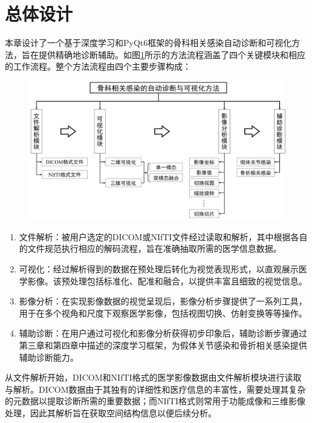 \section{总体设计}

本章设计了一个基于深度学习和PyQt6框架的骨科相关感染自动诊断和可视化方法，旨在提供精确地诊断辅助。如图\ref{fig:chap05_overall}所示的方法流程涵盖了四个关键模块和相应的工作流程。整个方法流程由四个主要步骤构成：

\begin{figure}[h]
  \centering
  \includegraphics[width=\textwidth]{figures/chap05_overall.jpg}
  \label{fig:chap05_overall}
\end{figure}

\begin{enumerate}
  \item 文件解析：被用户选定的DICOM或NIfTI文件经过读取和解析，其中根据各自的文件规范执行相应的解码流程，旨在准确抽取所需的医学信息数据。
  \item 可视化：经过解析得到的数据在预处理后转化为视觉表现形式，以直观展示医学影像。该预处理包括标准化、配准和融合，以提供丰富且细致的视觉信息。
  \item 影像分析：在实现影像数据的视觉呈现后，影像分析步骤提供了一系列工具，用于在多个视角和尺度下观察医学影像，包括视图切换、仿射变换等等操作。
  \item 辅助诊断：在用户通过可视化和影像分析获得初步印象后，辅助诊断步骤通过第三章和第四章中描述的深度学习框架，为假体关节感染和骨折相关感染提供辅助诊断能力。
\end{enumerate}

从文件解析开始，DICOM和NIfTI格式的医学影像数据由文件解析模块进行读取与解析。DICOM数据由于其独有的详细性和医疗信息的丰富性，需要处理其复杂的元数据以提取诊断所需的重要数据；而NIfTI格式则常用于功能成像和三维影像处理，因此其解析旨在获取空间结构信息以便后续分析。

